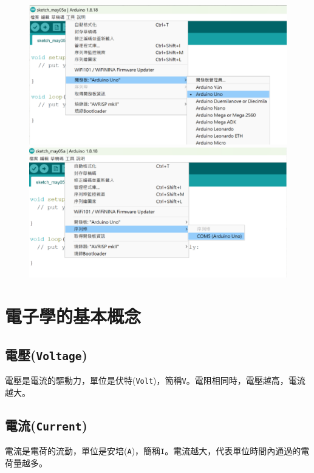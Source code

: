 \documentclass[12pt,a4paper]{article}
\begin{document}
\begin{figure}[h!]
    \centering
    \begin{minipage}{0.45\textwidth}
        \centering
        \includegraphics[width=\textwidth]{src/image1.png}
    \end{minipage}
    \hfill
    \begin{minipage}{0.45\textwidth}
        \centering
        \includegraphics[width=\textwidth]{src/image2.png}
    \end{minipage}
\end{figure}

\section{電子學的基本概念}

\subsection{電壓(\texttt{Voltage})}
電壓是電流的驅動力，單位是伏特(\texttt{Volt})，簡稱\texttt{V}。電阻相同時，電壓越高，電流越大。

\subsection{電流(\texttt{Current})}
電流是電荷的流動，單位是安培(\texttt{A})，簡稱\texttt{I}。電流越大，代表單位時間內通過的電荷量越多。
\end{document}
